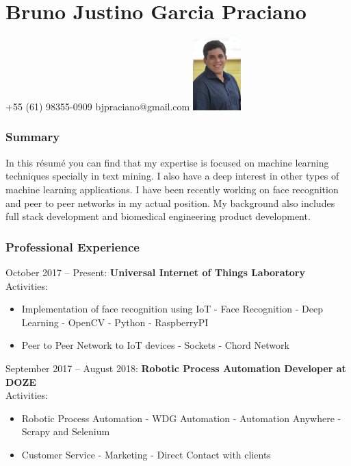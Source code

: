 \documentclass{tccv_full}
\begin{document}
\part{Bruno Justino Garcia Praciano}
{+55 (61) 98355-0909}
{bjpraciano@gmail.com}
{\mbox{\includegraphics[width=0.14\textwidth, trim=0 0cm 0 0]{CV1}}}

\vspace{1.9cm}

\section{Summary}

In this r\'esum\'e you can find that my expertise is focused on machine learning techniques specially in text mining. I also have a deep interest in other types of machine learning applications. I have been recently working on face recognition and peer to peer networks in my actual position. My background also includes full stack development and biomedical engineering product development.

\vspace{-0.4cm}
\section{Professional Experience}
	{\large October 2017 -- Present:	\textbf{Universal Internet of Things Laboratory}}
	Activities:
	\begin{itemize}
		\item \textsf{Implementation of face recognition using IoT}
		{\small
			\subitem - Face Recognition
			\subitem - Deep Learning
			\subitem - OpenCV
			\subitem - Python
			\subitem - RaspberryPI
		} 
		\item \textsf{Peer to Peer Network to IoT devices}
		{\small
			\subitem - Sockets
			\subitem - Chord Network
		}	

	\end{itemize}

	\vspace{0.7cm}
	{\large September 2017 -- August 2018:
	\textbf{Robotic Process Automation Developer at DOZE}\\}
	Activities:
	\begin{itemize}
		\item \textsf{Robotic Process Automation}
			{\small 
			\subitem - WDG Automation 
			\subitem - Automation Anywhere
			\subitem - Scrapy and Selenium
			}
		
		\item \textsf{Customer Service}
			{\small 
			\subitem - Marketing
			\subitem - Direct Contact with clients
			}
		
	\end{itemize}
	
\end{document}

